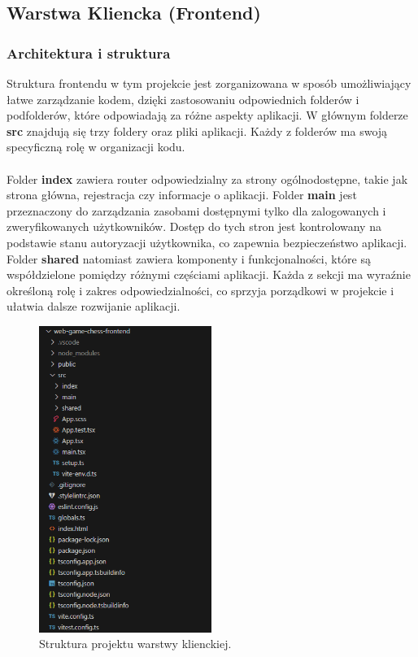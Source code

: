\documentclass[12pt,a4paper]{article}
\begin{document}
\newpage

\subsection{Warstwa Kliencka (Frontend)}

\subsubsection{Architektura i struktura}

Struktura frontendu w tym projekcie jest zorganizowana w sposób umożliwiający łatwe zarządzanie kodem, dzięki zastosowaniu odpowiednich folderów i podfolderów, które odpowiadają za różne aspekty aplikacji. W głównym folderze \textbf{src} znajdują się trzy foldery oraz pliki aplikacji. Każdy z folderów ma swoją specyficzną rolę w organizacji kodu.
\\\\
Folder \textbf{index} zawiera router odpowiedzialny za strony ogólnodostępne, takie jak strona główna, rejestracja czy informacje o aplikacji. Folder \textbf{main} jest przeznaczony do zarządzania zasobami dostępnymi tylko dla zalogowanych i zweryfikowanych użytkowników. Dostęp do tych stron jest kontrolowany na podstawie stanu autoryzacji użytkownika, co zapewnia bezpieczeństwo aplikacji. Folder \textbf{shared} natomiast zawiera komponenty i funkcjonalności, które są współdzielone pomiędzy różnymi częściami aplikacji. Każda z sekcji ma wyraźnie określoną rolę i zakres odpowiedzialności, co sprzyja porządkowi w projekcie i ułatwia dalsze rozwijanie aplikacji.

\vspace{0.5cm}
\begin{figure}[h!]
    \centering
    \includegraphics[width=0.5\textwidth]{images/struktura_front.png}
    \caption{Struktura projektu warstwy klienckiej.}
\end{figure}
\end{document}
